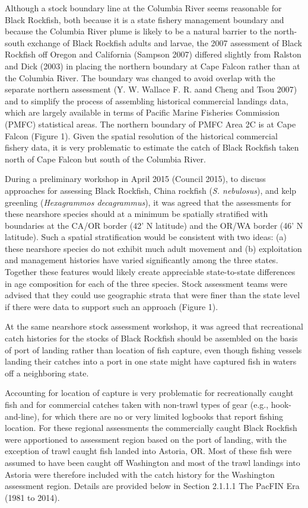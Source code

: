 \documentclass[11pt,
  english,
  letterpaper,
]{article}
\begin{document}
Although a stock boundary line at the Columbia River seems reasonable for Black Rockfish, both because it is a state fishery management boundary and because the Columbia River plume is likely to be a natural barrier to the north-south exchange of Black Rockfish adults and larvae, the 2007 assessment of Black Rockfish off Oregon and California (Sampson 2007) differed slightly from Ralston and Dick (2003) in placing the northern boundary at Cape Falcon rather than at the Columbia River. The boundary was changed to avoid overlap with the separate northern assessment (Y. W. Wallace F. R. aand Cheng and Tsou 2007) and to simplify the process of assembling historical commercial landings data, which are largely available in terms of Pacific Marine Fisheries Commission (PMFC) statistical areas. The northern boundary of PMFC Area 2C is at Cape Falcon (Figure 1). Given the spatial resolution of the historical commercial fishery data, it is very problematic to estimate the catch of Black Rockfish taken north of Cape Falcon but south of the Columbia River.

During a preliminary workshop in April 2015 (Council 2015), to discuss approaches for assessing Black Rockfish, China rockfish (\emph{S. nebulosus}), and kelp greenling (\emph{Hexagrammos decagrammus}), it was agreed that the assessments for these nearshore species should at a minimum be spatially stratified with boundaries at the CA/OR border (42' N latitude) and the OR/WA border (46' N latitude). Such a spatial stratification would be consistent with two ideas: (a) these nearshore species do not exhibit much adult movement and (b) exploitation and management histories have varied significantly among the three states. Together these features would likely create appreciable state-to-state differences in age composition for each of the three species. Stock assessment teams were advised that they could use geographic strata that were finer than the state level if there were data to support such an approach (Figure 1).

At the same nearshore stock assessment workshop, it was agreed that recreational catch histories for the stocks of Black Rockfish should be assembled on the basis of port of landing rather than location of fish capture, even though fishing vessels landing their catches into a port in one state might have captured fish in waters off a neighboring state.

Accounting for location of capture is very problematic for recreationally caught fish and for commercial catches taken with non-trawl types of gear (e.g., hook-and-line), for which there are no or very limited logbooks that report fishing location. For these regional assessments the commercially caught Black Rockfish were apportioned to assessment region based on the port of landing, with the exception of trawl caught fish landed into Astoria, OR. Most of these fish were assumed to have been caught off Washington and most of the trawl landings into Astoria were therefore included with the catch history for the Washington assessment region. Details are provided below in Section 2.1.1.1 The PacFIN Era (1981 to 2014).
\end{document}
